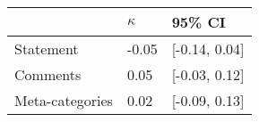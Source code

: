 \begin{tabular}{lll}
\hline
 & $\kappa$ & 95\% CI  \\
\hline
Statement & -0.05 & [-0.14, 0.04] \\
Comments & 0.05 & [-0.03, 0.12] \\
Meta-categories & 0.02 & [-0.09, 0.13] \\
\hline
\end{tabular}
